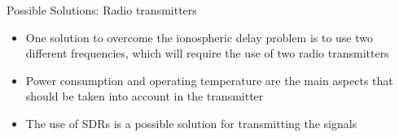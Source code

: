 \begin{frame}{Possible Solutions: Radio transmitters}

    \begin{itemize}
        \item One solution to overcome the ionospheric delay problem is to use two different frequencies, which will require the use of two radio transmitters
        \vspace{0.2cm}
        \item Power consumption and operating temperature are the main aspects that should be taken into account in the transmitter
        \vspace{0.2cm}
        \item The use of SDRs is a possible solution for transmitting the signals
    \end{itemize}

\end{frame}


